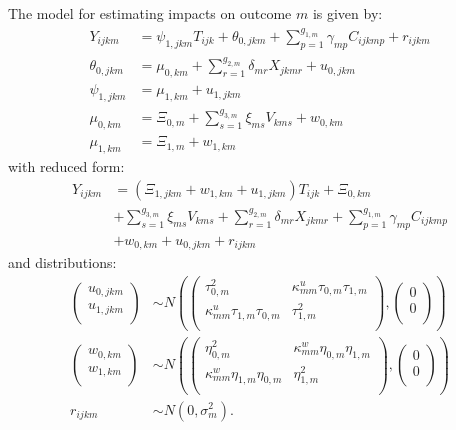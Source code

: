 \documentclass[12pt]{article}
\begin{document}
The model for estimating impacts on outcome $m$ is given by:
\begin{align}
Y_{ijkm} &= \psi_{1,jkm} T_{ijk} + \theta_{0,jkm} + \sum_{p=1}^{g_{1,m}} \gamma_{mp} C_{ijkmp} + r_{ijkm}\\
\nonumber \theta_{0,jkm} &= \mu_{0,km} + \sum_{r=1}^{g_{2,m}} \delta_{mr} X_{jkmr} + u_{0,jkm}\\
\nonumber \psi_{1,jkm} &= \mu_{1,km} + u_{1,jkm} \\
\nonumber \mu_{0,km}  &= \Xi_{0,m} + \sum_{s=1}^{g_{3,m}} \xi_{ms} V_{kms} + w_{0,km}\\
\nonumber \mu_{1,km}  &= \Xi_{1,m} + w_{1,km}
\end{align}
with reduced form:
\begin{align}
Y_{ijkm} &= \left(\Xi_{1,jkm} + w_{1,km} + u_{1,jkm}\right) T_{ijk} + \Xi_{0,km} \\
\nonumber & + \sum_{s=1}^{g_{3,m}} \xi_{ms} V_{kms} + \sum_{r=1}^{g_{2,m}} \delta_{mr} X_{jkmr} + \sum_{p=1}^{g_{1,m}} \gamma_{mp} C_{ijkmp}\\
 \nonumber &+ w_{0,km} + u_{0,jkm} + r_{ijkm}
\end{align}
and distributions:
\begin{align}
\begin{pmatrix} u_{0, jkm} \\ u_{1,jkm}\\ \end{pmatrix} &\sim
N\left(\begin{pmatrix} \tau^2_{0,m} & \kappa^u_{mm} \tau_{0,m} \tau_{1,m} \\ \kappa^u_{mm} \tau_{1,m} \tau_{0,m} & \tau^2_{1,m} \\ \end{pmatrix}, \begin{pmatrix} 0 \\ 0\\ \end{pmatrix}\right) \\
\nonumber \begin{pmatrix} w_{0, km} \\ w_{1,km}\\ \end{pmatrix} &\sim
N\left(\begin{pmatrix} \eta^2_{0,m} & \kappa^w_{mm} \eta_{0,m} \eta_{1,m} \\ \kappa^w_{mm} \eta_{1,m} \eta_{0,m} & \eta^2_{1,m} \\ \end{pmatrix}, \begin{pmatrix} 0 \\ 0\\ \end{pmatrix}\right) \\
\nonumber r_{ijkm} &\sim N\left(0, \sigma^2_m\right).
\end{align}
\end{document}
